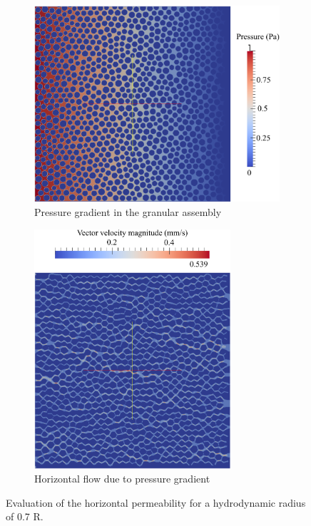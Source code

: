  
\begin{figure}[tbhp]
	\centering
	\begin{subfigure}[b]{0.475\textwidth}
		\centering
		\includegraphics[width=\textwidth]{Pressure}
		\caption{Pressure gradient in the granular assembly}
		\label{fig:pressure}
	\end{subfigure}
	\begin{subfigure}[b]{0.475\textwidth}
		\centering
		\includegraphics[width=0.8\textwidth]{Velocity}
		\caption{Horizontal flow due to pressure gradient}
		\label{fig:velocity}
	\end{subfigure}
	\caption{Evaluation of the horizontal permeability for a 
	hydrodynamic radius of 0.7 R.}
	\label{fig:perm}
\end{figure}


